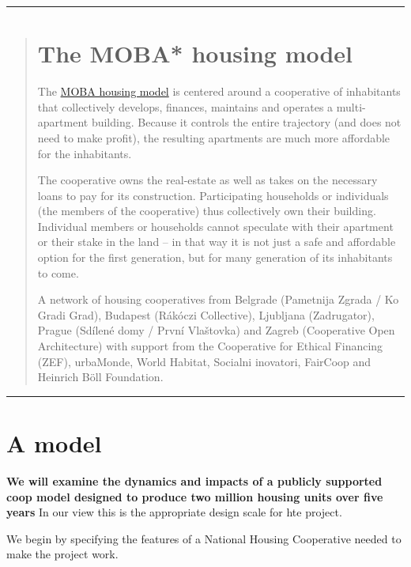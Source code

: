  \hrule
\color{SeaGreen}\vspace{1cm}
\begin{quotation}
\section*{The MOBA* housing model}

The \href{https://moba.coop/}{MOBA housing model}  is centered around a cooperative of inhabitants that collectively develops, finances, maintains and operates a multi-apartment building. Because it controls the entire trajectory (and does not need to make profit), the resulting apartments are much more affordable for the inhabitants. 


The cooperative owns the real-estate as well as takes on the necessary loans to pay for its construction. Participating households or individuals (the members of the cooperative) thus collectively own their building. Individual members or households cannot speculate with their apartment or their stake in the land – in that way it is not just a safe and affordable option for the first generation, but for many generation of its inhabitants to come.  


\tiny * A network of housing cooperatives from Belgrade (Pametnija Zgrada / Ko Gradi Grad), Budapest (R\'ak\'oczi Collective),  Ljubljana (Zadrugator), Prague (Sd\'ilen\'e domy / První Vlaštovka) and Zagreb (Cooperative Open Architecture)  with support from the Cooperative for Ethical Financing (ZEF), urbaMonde, World Habitat, Socialni inovatori, FairCoop and Heinrich B\"oll Foundation.\normalsize

 \end{quotation}
 \vspace{1cm}
 \hrule
 \color{black}

\newpage
\section{A model}
 \textbf{We will examine the dynamics and impacts of a publicly supported coop model designed to produce two million housing units over five years} In our view this is the appropriate design scale for hte project. 

 We begin by specifying the features of a National Housing Cooperative needed to make the project work.

